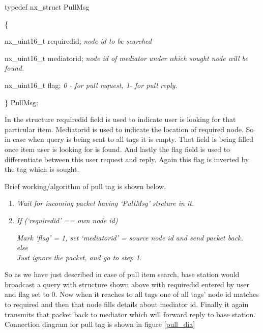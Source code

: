 \documentclass [a4paper,12pt]{book}
\begin{document}
\begin{framed}
typedef nx\_struct PullMsg

\{

  \hspace{2em}nx\_uint16\_t requiredid;	\hspace*{1em}	\emph{node id to be searched}

  \hspace{2em}nx\_uint16\_t mediatorid;	\hspace*{1em}\emph{node id of mediator under which sought node will be found.}

  \hspace{2em}nx\_uint16\_t flag;		\hspace*{4em}	\emph{0 - for pull request, 1- for pull reply.}

\} PullMsg;
\end{framed}

In the structure requiredid field is used to indicate user is looking for that particular item. Mediatorid is used to indicate the location of required node. So in case when query is being sent to all tags it is empty. That field is being filled once item user is looking for is found. And lastly the flag field is used to differentiate between this user request and reply. Again this flag is inverted by the tag which is sought.

Brief working/algorithm of pull tag is shown below.
\begin{framed}
\begin{enumerate}
\item \textit{Wait for incoming packet having `PullMsg' strcture in it.}
\item \textit{If (`requiredid' == own node id)}

\hspace*{2em}\textit{Mark `flag' = 1, set `mediatorid' = source node id and send packet back.}
\\
\textit{else}
\\
\hspace*{2em}\textit{Just ignore the packet, and go to step 1.}
\end{enumerate}
\end{framed}

So as we have just described in case of pull item search, base station would broadcast a query with structure shown above with requiredid entered by user and flag set to 0. Now when it reaches to all tags one of all tags' node id matches to required and then that node fills details about mediator id. Finally it again transmits that packet back to mediator which will forward reply to base station. Connection diagram for pull tag is shown in figure \ref{pull_dia}
\end{document}

